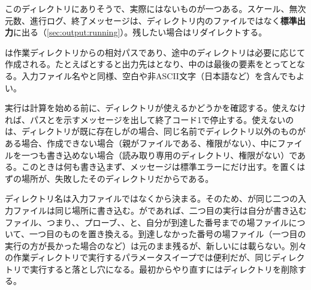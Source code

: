 このディレクトリにありそうで、実際にはないものが一つある。スケール、無次元数、進行ログ、終了メッセージは、ディレクトリ内のファイルではなく\textbf{標準出力}に出る（\cref{sec:output:running}）。残したい場合はリダイレクトする。

は作業ディレクトリからの相対パスであり、途中のディレクトリは必要に応じて作成される。たとえばとすると出力先はとなり、中のは最後の要素をとってとなる。入力ファイル名やと同様、空白や非ASCII文字（日本語など）を含んでもよい。

実行は計算を始める前に、ディレクトリが使えるかどうかを確認する。使えなければ、パスとを示すメッセージを出して終了コード1で停止する。使えないのは、ディレクトリが既に存在しがの場合、同じ名前でディレクトリ以外のものがある場合、作成できない場合（親がファイルである、権限がない）、中にファイルを一つも書き込めない場合（読み取り専用のディレクトリ、権限がない）である。このときは何も書き込まず、メッセージは標準エラーにだけ出す。を置くはずの場所が、失敗したそのディレクトリだからである。

\begin{note}[二つの実行が同じディレクトリに書き込むことがある]
  ディレクトリ名は入力ファイルではなくから決まる。そのため、が同じ二つの入力ファイルは同じ場所に書き込む。がであれば、二つ目の実行は自分が書き込むファイル、つまり、、プローブ、、と、自分が到達した番号までの場ファイルについて、一つ目のものを置き換える。到達しなかった番号の場ファイル（一つ目の実行の方が長かった場合のなど）は元のまま残るが、新しいには載らない。別々の作業ディレクトリで実行するパラメータスイープでは便利だが、同じディレクトリで実行すると落とし穴になる。最初からやり直すにはディレクトリを削除する。
\end{note}

\section{}
\label{sec:output:jobinfo}

